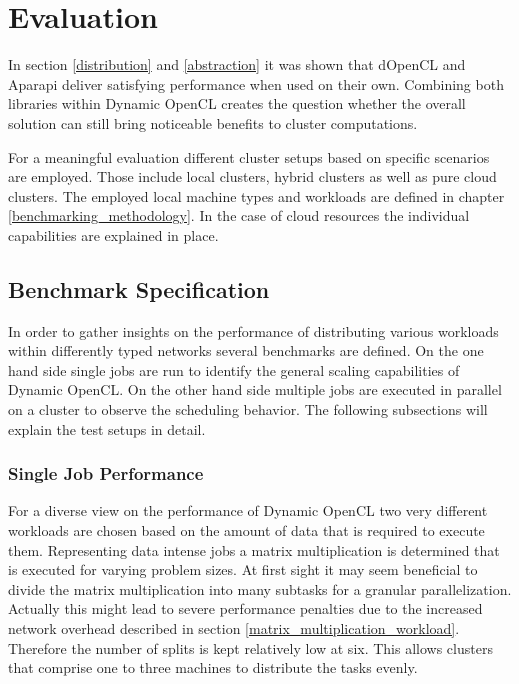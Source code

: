 \chapter{Evaluation}

In section \ref{distribution} and \ref{abstraction} it was shown that dOpenCL and Aparapi deliver satisfying performance when used on their own. Combining both libraries within Dynamic OpenCL creates the question whether the overall solution can still bring noticeable benefits to cluster computations.

For a meaningful evaluation different cluster setups based on specific scenarios are employed. Those include local clusters, hybrid clusters as well as pure cloud clusters. The employed local machine types and workloads are defined in chapter \ref{benchmarking_methodology}. In the case of cloud resources the individual capabilities are explained in place.

\section{Benchmark Specification}

In order to gather insights on the performance of distributing various workloads within differently typed networks several benchmarks are defined. On the one hand side single jobs are run to identify the general scaling capabilities of Dynamic OpenCL. On the other hand side multiple jobs are executed in parallel on a cluster to observe the scheduling behavior. The following subsections will explain the test setups in detail.

\subsection{Single Job Performance}

For a diverse view on the performance of Dynamic OpenCL two very different workloads are chosen based on the amount of data that is required to execute them. Representing data intense jobs a matrix multiplication is determined that is executed for varying problem sizes. At first sight it may seem beneficial to divide the matrix multiplication into many subtasks for a granular parallelization. Actually this might lead to severe performance penalties due to the increased network overhead described in section \ref{matrix_multiplication_workload}. Therefore the number of splits is kept relatively low at six. This allows clusters that comprise one to three machines to distribute the tasks evenly.

